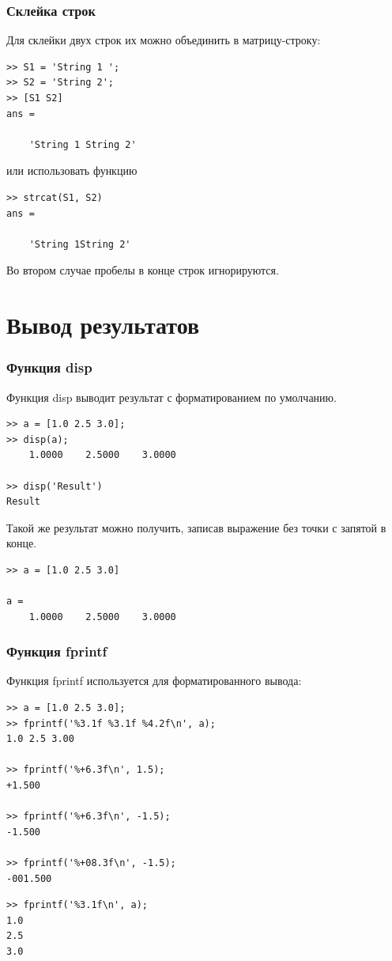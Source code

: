 \documentclass[11pt, compress]{beamer}
\begin{document}
\begin{frame}[fragile]
\frametitle{Склейка строк}
Для склейки двух строк их можно объединить в матрицу-строку:
\begin{lstlisting}
>> S1 = 'String 1 ';
>> S2 = 'String 2';
>> [S1 S2]
ans =

    'String 1 String 2'
\end{lstlisting}
или использовать функцию 
\begin{lstlisting}
>> strcat(S1, S2)
ans =

    'String 1String 2'
\end{lstlisting} 
Во втором случае пробелы в конце строк игнорируются.
\end{frame}

\section{Вывод результатов}

\begin{frame}[fragile]  
\frametitle{Функция disp}
Функция \alert{disp} выводит результат с форматированием по умолчанию.  
\begin{lstlisting}
>> a = [1.0 2.5 3.0];
>> disp(a);
    1.0000    2.5000    3.0000

>> disp('Result')    
Result
\end{lstlisting}
Такой же результат можно получить, записав выражение без точки с запятой в конце.
\begin{lstlisting}
>> a = [1.0 2.5 3.0]

a =
    1.0000    2.5000    3.0000
\end{lstlisting}  
\end{frame}

\begin{frame}[fragile]
\frametitle{Функция fprintf}
Функция \alert{fprintf} используется для форматированного вывода:
\begin{lstlisting}
>> a = [1.0 2.5 3.0];
>> fprintf('%3.1f %3.1f %4.2f\n', a);
1.0 2.5 3.00

>> fprintf('%+6.3f\n', 1.5);
+1.500 

>> fprintf('%+6.3f\n', -1.5);
-1.500 

>> fprintf('%+08.3f\n', -1.5);
-001.500 
\end{lstlisting}

\begin{lstlisting}
>> fprintf('%3.1f\n', a);
1.0
2.5
3.0
\end{lstlisting}
\end{frame}
\end{document}
